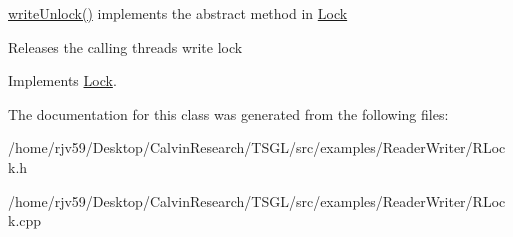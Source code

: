 \hyperlink{class_r_lock_a4c69e6a1922b1aab3a84afeececad3fa}{write\+Unlock()} implements the abstract method in \hyperlink{class_lock}{Lock} 

Releases the calling thread\textquotesingle{}s write lock 

Implements \hyperlink{class_lock}{Lock}.



The documentation for this class was generated from the following files\+:\begin{DoxyCompactItemize}
\item 
/home/rjv59/\+Desktop/\+Calvin\+Research/\+T\+S\+G\+L/src/examples/\+Reader\+Writer/R\+Lock.\+h\item 
/home/rjv59/\+Desktop/\+Calvin\+Research/\+T\+S\+G\+L/src/examples/\+Reader\+Writer/R\+Lock.\+cpp\end{DoxyCompactItemize}
